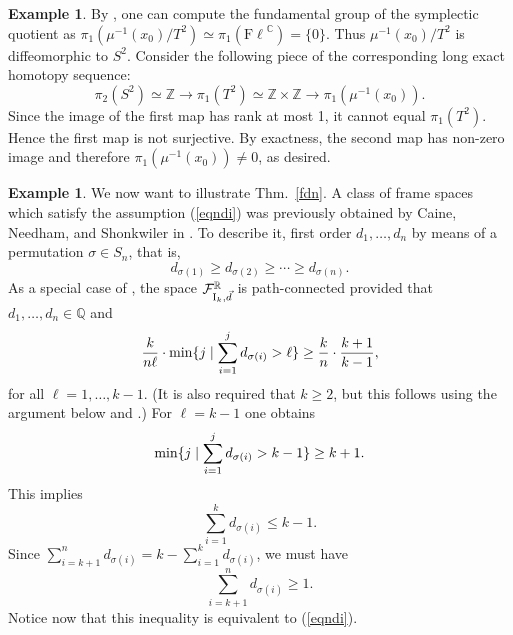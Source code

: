 \documentclass[12pt]{amsart}
\theoremstyle{definition}
\newtheorem{ex}[thm]{Example}
\theoremstyle{remark}
\newcommand{\RR}{\mathbb R}
\newcommand{\ZZ}{\mathbb Z}
\newcommand{\CC}{\mathbb C}
\newcommand{\Fl}{{\mathrm{F\ell}}}
\begin{document}
\begin{ex}
\noindent By 
\cite[Theorem 1.2]{HL}, one can compute the fundamental group of the symplectic quotient as $\pi_1(\mu^{-1}(x_0)/T^2)\simeq \pi_1(\Fl^\CC)=\{0\}.$ Thus
$\mu^{-1}(x_0)/T^2$ is diffeomorphic to $S^2$. Consider the following piece of the corresponding long exact homotopy sequence:
$$\pi_2(S^2)\simeq \ZZ  \to \pi_1(T^2)\simeq \ZZ\times \ZZ  \to \pi_1(\mu^{-1}(x_0)).$$
Since the image of the first map has rank at most 1, it cannot equal $\pi_1(T^2)$. Hence the first map is not surjective. By exactness, the second map has non-zero image and therefore  $\pi_1(\mu^{-1}(x_0)) \neq 0$, as desired. 
\end{ex}

\begin{ex} \label{ex:last} We now want to illustrate Thm.~\ref{fdn}. A class of frame spaces which satisfy the assumption (\ref{eqndi})  was previously obtained by Caine, Needham, and Shonkwiler in \cite{CNS}.
To describe it, first order $d_1, \ldots, d_n$ by means of a permutation 
 $\sigma\in S_n$, that is,
 $$d_{\sigma(1)} \ge d_{\sigma(2)} \ge \cdots \ge d_{\sigma(n)}.$$
 As a special case of \cite[Thm.~4.5]{CNS},  the space ${\mathcal F}^\RR_{{\rm I}_k, \vec{d}}$ is path-connected provided that $d_1, \ldots, d_n \in {\mathbb Q}$ and 
 $$\frac{k}{n\ell}\cdot {\rm min} \{j \mid \sum_{i=1}^j d_{\sigma(i)} >\ell \} \ge \frac{k}{n}\cdot \frac{k+1}{k-1},$$
 for all $\ell =1, \ldots, k-1$. (It is also required that $k\ge 2$, but this follows using the argument below and \cite[Rem.~1.2]{Ma1}.) 
For $\ell = k-1$ one obtains
$$  {\rm min} \{ j \mid \sum_{i=1}^j  d_{\sigma(i)} > k-1\}\ge k+1.$$
This implies
$$ \sum_{i=1}^k  d_{\sigma(i)} \le k-1.$$
Since 
 $\sum_{i=k+1}^n d_{\sigma(i)} = k-\sum_{i=1}^k d_{\sigma(i)}$, we must have 
 $$ \sum_{i=k+1}^n d_{\sigma(i)}  \ge 1.$$
 Notice now that this inequality is equivalent to (\ref{eqndi}). 
 \end{ex}
\end{document}
